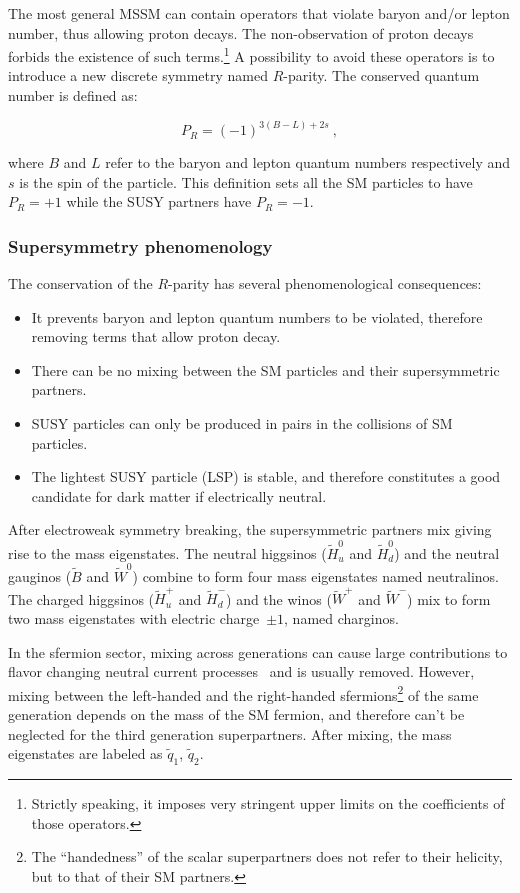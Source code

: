 The most general MSSM can contain operators that violate baryon and/or lepton number, thus allowing proton decays. The non-observation of proton decays forbids the existence of such terms.\footnote{
Strictly speaking, it imposes very stringent upper limits on the coefficients of those operators.}
A possibility to avoid these operators is to introduce a new discrete symmetry named $R$-parity. The conserved quantum number is defined as:

\begin{equation}
  P_R = (-1)^{3(B-L)+2s}~,
  \label{eq:RparityDefinition}
\end{equation}

\noindent where $B$ and $L$ refer to the baryon and lepton quantum numbers respectively and $s$ is the spin of the particle.
This definition sets all the SM particles to have $P_R = +1$ while the SUSY partners have $P_R = -1$.

\subsubsection{Supersymmetry phenomenology}
The conservation of the $R$-parity has several phenomenological consequences:

\begin{itemize}
  \item It prevents baryon and lepton quantum numbers to be violated, therefore removing terms that allow proton decay.
  \item There can be no mixing between the SM particles and their supersymmetric partners.
  \item SUSY particles can only be produced in pairs in the collisions of SM particles.
  \item The lightest SUSY particle (LSP) is stable, and therefore constitutes a good candidate for dark matter if electrically neutral.
\end{itemize}

After electroweak symmetry breaking, the supersymmetric partners mix giving rise to the mass eigenstates. 
The neutral higgsinos ($\tilde{H}_u^0$ and $\tilde{H}_d^0$) and the neutral gauginos ($\tilde{B}$ and $\tilde{W}^0$) combine to form four mass eigenstates named neutralinos.
The charged higgsinos ($\tilde{H}^+_u$ and $\tilde{H}^-_d$) and the winos ($\tilde{W}^+$ and $\tilde{W}^-$) mix to form two mass eigenstates with electric charge~$\pm 1$, named charginos.

In the sfermion sector, mixing across generations can cause large contributions to flavor changing neutral current processes~\cite{Ellis:1981ts} and is usually removed. However, mixing between the left-handed and the right-handed sfermions\footnote{
  The ``handedness'' of the scalar superpartners does not refer to their helicity, but to that of their SM partners.
}
of the same generation depends on the mass of the SM fermion, and therefore can't be neglected for the third generation superpartners.
After mixing, the mass eigenstates are labeled as $\tilde{q}_1$, $\tilde{q}_2$.

